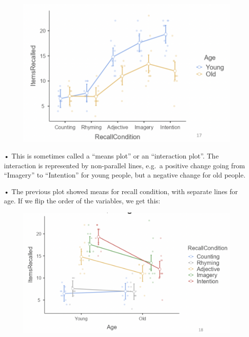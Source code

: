 \documentclass[
  letterpaper,
  DIV=11,
  numbers=noendperiod]{scrreprt}
\begin{document}
\begin{figure}

{\centering \includegraphics[width=4.65625in,height=\textheight]{images/Mod5_6.png}

}

\end{figure}

• This is sometimes called a ``means plot'' or an ``interaction plot''.
The interaction is represented by non-parallel lines, e.g.~a positive
change going from ``Imagery'' to ``Intention'' for young people, but a
negative change for old people.

• The previous plot showed means for recall condition, with separate
lines for age. If we flip the order of the variables, we get this:

\begin{figure}

{\centering \includegraphics[width=5.03125in,height=\textheight]{images/Mod5_7.png}

}

\end{figure}
\end{document}
